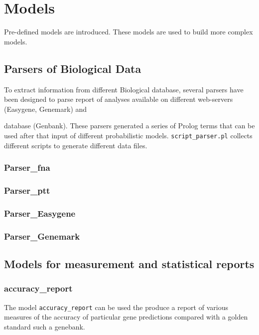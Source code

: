 \documentclass{book}
\begin{document}
\chapter{Models}

Pre-defined models are introduced.  These models are used to build more complex models.

\section{Parsers of Biological Data}

To extract information from different Biological database, several parsers have been designed 
to parse report of analyses available on different web-servers (Easygene, Genemark) and 

database (Genbank). These parsers generated a series of Prolog terms that can be used after that
input of different probabilistic models. \texttt{script\_parser.pl} collects different scripts to generate
different data files.

\subsection{Parser\_fna}

\subsection{Parser\_ptt}

\subsection{Parser\_Easygene}

\subsection{Parser\_Genemark}

\section{Models for measurement and statistical reports}

\subsection{accuracy\_report}

The model \texttt{accuracy\_report} can be used the produce a report of
various measures of the accuracy of particular gene predictions
compared with a golden standard such a genebank. 
\end{document}

